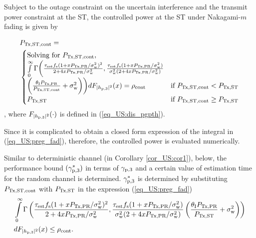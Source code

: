 \begin{lemma} \label{lm_US:lm6}
\normalfont
Subject to the outage constraint on the uncertain interference and the transmit power constraint at the ST, the controlled power at the ST under Nakagami-$m$ fading is given by %

\begin{align}
&P_{\text{Tx,ST,cont}} = \nonumber \\ 
& \begin{cases} 
\text{Solving for $P_{\text{Tx,ST,cont}}$, } \\ \int\limits_{0}^{\infty} \Gamma\bigg(\frac{\tau_{\text{est}} f_{\text{s}} (1 + x P_{\text{Tx,PR}}/\sigma^2_{\text{w}})^2}{2 + 4 x P_{\text{Tx,PR}}/\sigma^2_{\text{w}}}, \frac{\tau_{\text{est}} f_{\text{s}} (1 + x P_{\text{Tx,PR}}/\sigma^2_{\text{w}})}{\sigma^2_{\text{w}} (2 + 4 x P_{\text{Tx,PR}}/\sigma^2_{\text{w}})} \\ \bigg(\frac{\theta_{\text{I}}P_{\text{Tx,PR}}}{P_{\text{Tx,ST,cont}}}  +  \sigma^2_{\text{w}} \bigg)\bigg) d F_{|h_{\text{p,3}}|^2}(x) = \rho_{\text{cont}} & \mbox{if } P_{\text{Tx,ST,cont}} < P_{\text{Tx,ST}} \\
P_{\text{Tx,ST}} & \mbox{if } P_{\text{Tx,ST,cont}} \ge P_{\text{Tx,ST}}
\end{cases}
\label{eq_US:preg_fad} 
\end{align}
, where %
$F_{|h_{\text{p,3}}|^2}(\cdot)$ is defined in (\ref{eq_US:dis_pgpth}). 
\end{lemma} 
\begin{IEEEproof}
Since it is complicated to obtain a closed form expression of the integral in (\ref{eq_US:preg_fad}), therefore, the controlled power is evaluated numerically.  
\end{IEEEproof}
Similar to deterministic channel (in Corollary \ref{cor_US:cor1}), below, the performance bound $({\gamma}_{\text{p,3}}^*)$ in terms of ${\gamma}_{\text{p,3}}$ and a certain value of estimation time for the random channel is determined.
 ${\gamma}_{\text{p,3}}^*$ is determined by substituting $P_{\text{Tx,ST,cont}}$ with $P_{\text{Tx,ST}}$ in the expression (\ref{eq_US:preg_fad}) 
\begin{align}
&\int\limits_{0}^{\infty} \Gamma\left( \frac{\tau_{\text{est}} f_{\text{s}} (1 + x P_{\text{Tx,PR}}/\sigma^2_{\text{w}})^2}{2 + 4 x P_{\text{Tx,PR}}/\sigma^2_{\text{w}}}, \frac{\tau_{\text{est}} f_{\text{s}} (1 + x P_{\text{Tx,PR}}/\sigma^2_{\text{w}})}{\sigma^2_{\text{w}} (2 + 4 x P_{\text{Tx,PR}}/\sigma^2_{\text{w}})}  \left(\frac{\theta_{\text{I}}P_{\text{Tx,PR}}}{P_{\text{Tx,ST}}} + \sigma^2_{\text{w}} \right)\right) \nonumber \\ & d F_{|h_{\text{p,3}}|^2}(x) \le \rho_{\text{cont}}. \label{eq_US:or_fad}
\end{align}
